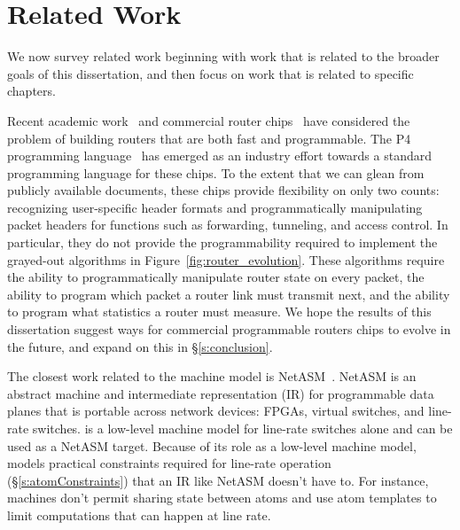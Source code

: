 \chapter{Related Work}
\label{chap:related}

We now survey related work beginning with work that is related to the broader
goals of this dissertation, and then focus on work that is related to specific
chapters.

Recent academic work~\cite{rmt} and commercial router chips~\cite{tofino,
flexpipe, xpliant} have considered the problem of building routers that are
both fast and programmable. The P4 programming language~\cite{p4} has emerged
as an industry effort towards a standard programming language for these chips.
To the extent that we can glean from publicly available documents, these chips
provide flexibility on only two counts: recognizing user-specific header
formats and programmatically manipulating packet headers for functions such as
forwarding, tunneling, and access control. In particular, they do not provide
the programmability required to implement the grayed-out algorithms in
Figure~\ref{fig:router_evolution}.  These algorithms require the ability to
programmatically manipulate router state on every packet, the ability to
program which packet a router link must transmit next, and the ability to
program what statistics a router must measure. We hope the results of this
dissertation suggest ways for commercial programmable routers chips to evolve
in the future, and expand on this in \S\ref{s:conclusion}.

The closest work related to the \absmachine machine model is
NetASM~\cite{netasm}. NetASM is an abstract machine and intermediate
representation (IR) for programmable data planes that is portable across
network devices: FPGAs, virtual switches, and line-rate switches.  \absmachine
is a low-level machine model for line-rate switches alone and can be used as a
NetASM target. Because of its role as a low-level machine model, \absmachine
models practical constraints required for line-rate operation
(\S\ref{s:atomConstraints}) that an IR like NetASM doesn't have to. For
instance, \absmachine machines don't permit sharing state between atoms and use
atom templates to limit computations that can happen at line rate.

